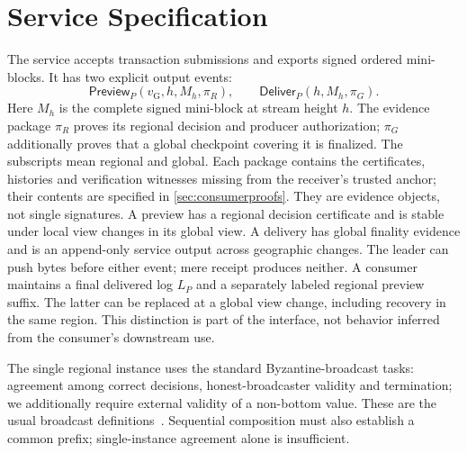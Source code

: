 \documentclass[11pt,a4paper,onecolumn]{article}
\newcommand{\gv}{v_{\mathrm G}}
\newcommand{\Tag}[1]{\mathsf{#1}}
\theoremstyle{remark}\newtheorem{example}[definition]{Example}
\begin{document}
\section{Service Specification}\label{sec:spec}
The service accepts transaction submissions and exports signed ordered
mini-blocks. It has two explicit output events:
\[
 \Tag{Preview}_P(\gv,h,M_h,\pi_R),\qquad
 \Tag{Deliver}_P(h,M_h,\pi_G).
\]
Here $M_h$ is the complete signed mini-block at stream height $h$.
The evidence package $\pi_R$ proves its regional decision and producer
authorization; $\pi_G$ additionally proves that a global checkpoint covering
it is finalized. The subscripts mean regional and global. Each package contains
the certificates, histories and verification witnesses missing from the
receiver's trusted anchor; their contents are specified in
\cref{sec:consumerproofs}. They are evidence objects, not single signatures.
A preview has a regional decision certificate and is stable under local view
changes in its global view. A delivery has global finality evidence and is an
append-only service output across geographic changes. The leader can push bytes
before either event; mere receipt produces neither. A consumer maintains a
final delivered log $L_P$ and a separately labeled regional preview suffix.
The latter can be replaced at a global view change, including recovery
in the same region. This distinction is part
of the interface, not behavior inferred from the consumer's downstream use.

The single regional instance uses the standard Byzantine-broadcast tasks:
agreement among correct decisions, honest-broadcaster validity and termination;
we additionally require external validity of a non-bottom value. These are
the usual broadcast definitions~\cite{goodcase}. Sequential composition must
also establish a common prefix; single-instance agreement alone is insufficient.
\end{document}
